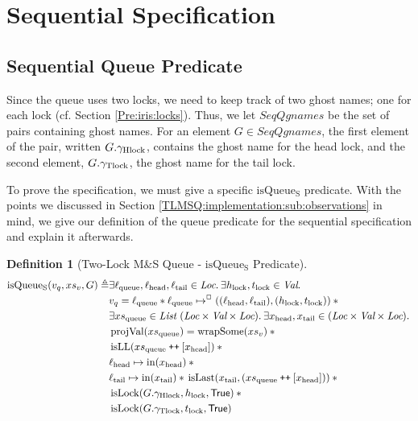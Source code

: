 \documentclass[a4paper, 10pt]{report}
\theoremstyle{definition}
\newtheorem{definition}{Definition}[section]
\newcommand{\isLock}{\operatorname{isLock}}
\newcommand{\msq}{M\&S Queue}
\newcommand{\tlmsq}{Two-Lock \msq{}}
\newcommand{\isqueueseq}{\operatorname{isQueue_{S}}}
\newcommand{\SeqQgnames}{SeqQgnames}
\newcommand{\vq}{v_q}
\newcommand{\xsqueue}{xs_{\mathrm{queue}}}
\newcommand{\isLL}{\operatorname{isLL}}
\newcommand{\projval}{\operatorname{projVal}}
\newcommand{\wrapsome}{\operatorname{wrapSome}}
\newcommand{\isLast}{\operatorname{isLast}}
\newcommand{\locN}[1]{\loc_{\mathrm{#1}}}
\newcommand{\lochead}{\locN{head}}
\newcommand{\loctail}{\locN{tail}}
\newcommand{\locqueue}{\locN{queue}}
\newcommand{\nIn}[1]{\operatorname{in}(#1)}
\newcommand{\node}{x}
\newcommand{\nodeN}[1]{\node_{\mathrm{#1}}}
\newcommand{\nodehead}{\nodeN{head}}
\newcommand{\nodetail}{\nodeN{tail}}
\newcommand{\absvalueList}{xs_v}
\newcommand{\Hlock}{h_{\mathrm{lock}}}
\newcommand{\Tlock}{t_{\mathrm{lock}}}
\newcommand{\Qg}{G}
\newcommand{\ghlock}{\gname_{\mathrm{Hlock}}}
\newcommand{\gtlock}{\gname_{\mathrm{Tlock}}}
\newcommand\catenate{\mathbin{\text{\ttfamily\upshape ++}}}
\begin{document}
\section{Sequential Specification}
\label{TLMSQSPECS:section:sequential}

\subsection{Sequential Queue Predicate}
\label{TLMSQSPECS:sequential:sub:seq-queue-pred}

Since the queue uses two locks, we need to keep track of two ghost names; one for each lock (cf. Section \ref{Pre:iris:locks}). Thus, we let $\SeqQgnames$ be the set of pairs containing ghost names. For an element $\Qg \in \SeqQgnames$, the first element of the pair, written $\Qg.\ghlock$, contains the ghost name for the head lock, and the second element, $\Qg.\gtlock$, the ghost name for the tail lock.

To prove the specification, we must give a specific $\isqueueseq$ predicate. With the points we discussed in Section \ref{TLMSQ:implementation:sub:observations} in mind, we give our definition of the queue predicate for the sequential specification and explain it afterwards.
\begin{definition}[\tlmsq{} - $\isqueueseq$ Predicate]\label{TLMSQ:spec:seq:isqueueseq}
\begin{align*}
  \isqueueseq(\vq, \absvalueList, \Qg) \eqdef
  &\Exists \locqueue, \lochead, \loctail \in \Loc . \Exists \Hlock, \Tlock \in \Val . \\
  &\vq = \locqueue \star{} \locqueue \mapsto^{\persistently} ((\lochead, \loctail), (\Hlock, \Tlock)) \star{}\\
  &\Exists \xsqueue \in \List ~ (\Loc \times \Val \times \Loc) . \Exists \nodehead, \nodetail \in (\Loc \times \Val \times \Loc) .\\
	&\projval(\xsqueue) = \wrapsome(\absvalueList) \star{}\\
	&\isLL (\xsqueue \catenate [\nodehead]) \star{}\\
	&\lochead \mapsto \nIn{\nodehead} \star{}\\
	&\loctail \mapsto \nIn{\nodetail} \star{} \isLast(\nodetail, (\xsqueue \catenate [\nodehead])) \star{}\\
	&\isLock(\Qg.\ghlock, \Hlock, \TRUE) \star{}\\
	&\isLock(\Qg.\gtlock, \Tlock, \TRUE)
\end{align*}
\end{definition}
\end{document}
